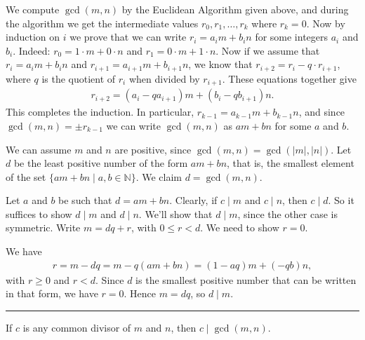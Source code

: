 \documentclass[letterpaper,10pt,english]{sphinxmanual}
\begin{document}
\sphinxAtStartPar
{} We compute \(\gcd(m,n)\) by the Euclidean Algorithm given above, and during the algorithm we get the intermediate values \(r_0, r_1, \ldots, r_k\) where \(r_k = 0\). Now by induction on \(i\) we prove that we can write \(r_i = a_i m+b_i n\) for some integers \(a_i\) and \(b_i\). Indeed: \(r_0 = 1\cdot m + 0\cdot n\) and \(r_1 = 0\cdot m + 1\cdot n\). Now if we assume that \(r_i = a_i m+b_i n\) and \(r_{i+1} = a_{i+1}m+b_{i+1}n\), we know that \(r_{i+2} = r_i - q\cdot r_{i+1}\), where \(q\) is the quotient of \(r_i\) when divided by \(r_{i+1}\). These equations together give
\begin{equation*}
\begin{split}r_{i+2} = (a_i-qa_{i+1})m + (b_i-qb_{i+1})n.\end{split}
\end{equation*}
\sphinxAtStartPar
This completes the induction. In particular, \(r_{k-1} = a_{k-1}m+b_{k-1}n\), and since \(\gcd(m,n)=\pm r_{k-1}\) we can write \(\gcd(m,n)\) as \(am+bn\) for some \(a\) and \(b\).

\sphinxAtStartPar
{} We can assume \(m\) and \(n\) are positive, since \(\gcd(m, n) = \gcd(|m|, |n|)\). Let \(d\) be the least positive number of the form \(a m + b n\), that is, the smallest element of the set \(\{ a m + b n \mid a, b\in \mathbb N \}\). We claim \(d = \gcd(m, n)\).

\sphinxAtStartPar
Let \(a\) and \(b\) be such that \(d = a m + b n\). Clearly, if \(c \mid m\) and \(c \mid n\), then \(c \mid d\). So it suffices to show \(d \mid m\) and \(d \mid n\). We’ll show that \(d \mid m\), since the other case is symmetric. Write \(m = d q + r\), with \(0 \le r < d\). We need to show \(r = 0\).

\sphinxAtStartPar
We have
\begin{equation*}
\begin{split}r = m - dq = m - q (a m + b n) = (1 - aq)m + (- q b) n,\end{split}
\end{equation*}
\sphinxAtStartPar
with \(r \ge 0\) and \(r < d\).  Since \(d\) is the smallest positive number that can be written in that form, we have \(r = 0\). Hence \(m = dq\), so \(d \mid m\).


\bigskip\hrule\bigskip


\sphinxAtStartPar
{} If \(c\) is any common divisor of \(m\) and \(n\), then \(c \mid \gcd(m, n)\).
\end{document}
